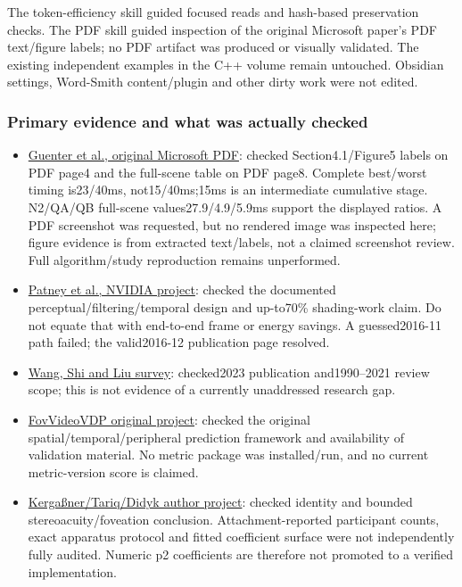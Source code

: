 The token-efficiency skill guided focused reads and hash-based preservation checks. The PDF skill guided inspection of the original Microsoft paper's PDF text/figure labels; no PDF artifact was produced or visually validated. The existing independent examples in the C++ volume remain untouched. Obsidian settings, Word-Smith content/plugin and other dirty work were not edited.

\subsubsection{Primary evidence and what was actually checked}\label{appendix-a103e7846d21-primary-evidence-and-what-was-actually-checked}

\begin{itemize}
\tightlist
\item
  \href{https://www.microsoft.com/en-us/research/wp-content/uploads/2012/11/foveated_final15.pdf}{Guenter et al., original Microsoft PDF}: checked Section4.1/Figure5 labels on PDF page4 and the full-scene table on PDF page8. Complete best/worst timing is23/40ms, not15/40ms;15ms is an intermediate cumulative stage. N2/QA/QB full-scene values27.9/4.9/5.9ms support the displayed ratios. A PDF screenshot was requested, but no rendered image was inspected here; figure evidence is from extracted text/labels, not a claimed screenshot review. Full algorithm/study reproduction remains unperformed.
\item
  \href{https://research.nvidia.com/publication/2016-12_towards-foveated-rendering-gaze-tracked-virtual-reality}{Patney et al., NVIDIA project}: checked the documented perceptual/filtering/temporal design and up-to70\% shading-work claim. Do not equate that with end-to-end frame or energy savings. A guessed2016-11 path failed; the valid2016-12 publication page resolved.
\item
  \href{https://link.springer.com/article/10.1007/s41095-022-0306-4}{Wang, Shi and Liu survey}: checked2023 publication and1990--2021 review scope; this is not evidence of a currently unaddressed research gap.
\item
  \href{https://www.cl.cam.ac.uk/research/rainbow/projects/fovvideovdp/}{FovVideoVDP original project}: checked the original spatial/temporal/peripheral prediction framework and availability of validation material. No metric package was installed/run, and no current metric-version score is claimed.
\item
  \href{https://sophie-kergassner.github.io/depth-in-periphery.html}{Kergaßner/Tariq/Didyk author project}: checked identity and bounded stereoacuity/foveation conclusion. Attachment-reported participant counts, exact apparatus protocol and fitted coefficient surface were not independently fully audited. Numeric p2 coefficients are therefore not promoted to a verified implementation.

\end{itemize}
